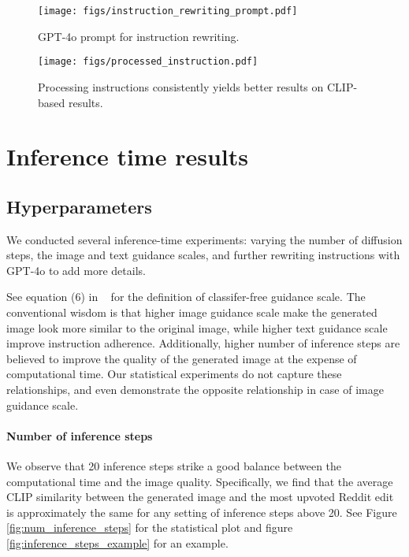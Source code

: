 


\begin{figure}[h]
    \centering
    \texttt{[image: figs/instruction\_rewriting\_prompt.pdf]}
    \caption{GPT-4o prompt for instruction rewriting.}
    \label{fig:instruction_rewriting}
\end{figure}

\begin{figure*}[h]
    \centering
    \texttt{[image: figs/processed\_instruction.pdf]}
    \caption{Processing instructions consistently yields better results on CLIP-based results.}
    \label{fig:processed_instruction}
\end{figure*}

\section{Inference time results}
\subsection{Hyperparameters}

We conducted several inference-time experiments: varying the number of diffusion steps, the image and text guidance scales, and further rewriting instructions with GPT-4o to add more details. 

See equation (6) in ~\cite{ho2022classifier} for the definition of classifer-free guidance scale. The conventional wisdom is that higher image guidance scale make the generated image look more similar to the original image, while higher text guidance scale improve instruction adherence. Additionally, higher number of inference steps are believed to improve the quality of the generated image at the expense of computational time. Our statistical experiments do not capture these relationships, and even demonstrate the opposite relationship in case of image guidance scale.

\paragraph{Number of inference steps}
We observe that 20 inference steps strike a good balance between the computational time and the image quality. Specifically, we find that the average CLIP similarity between the generated image and the most upvoted Reddit edit is approximately the same for any setting of inference steps above 20. See Figure \ref{fig:num_inference_steps} for the statistical plot and figure \ref{fig:inference_steps_example} for an example.

